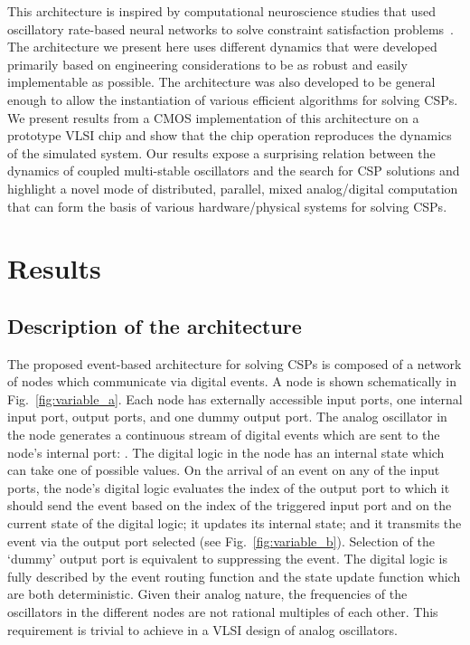 \documentclass[10pt]{article}
\begin{document}
This architecture is inspired by computational neuroscience studies that used oscillatory rate-based neural networks to solve constraint satisfaction problems~\cite{Mostafa_etal13b}. The architecture we present here uses different dynamics that were developed primarily based on engineering considerations to be as robust and easily implementable as possible. The architecture was also developed to be general enough to allow the instantiation of various efficient algorithms for solving CSPs. We present results from a CMOS implementation of this architecture on a prototype VLSI chip and show that the chip operation reproduces the dynamics of the simulated system.
Our results expose a surprising relation between the dynamics of coupled multi-stable oscillators and the search for CSP solutions and highlight a novel mode of distributed, parallel, mixed analog/digital computation that can form the basis of various hardware/physical systems for solving CSPs.








\section*{Results}
\subsection*{Description of the architecture}

The proposed event-based architecture for solving CSPs is composed of a network of nodes which communicate via digital events. A node is shown schematically in Fig.~\ref{fig:variable_a}. Each node has  externally accessible input ports, one internal input port,  output ports, and one dummy output port. The analog oscillator in the node generates a continuous stream of digital events which are sent to the node's internal port: . The digital logic in the node has an internal state  which can take one of  possible values. On the arrival of an event on any of the input ports, the node's digital logic evaluates the index of the output port to which it should send the event based on the index of the triggered input port and on the current state of the digital logic; it updates its internal state; and it transmits the event via the output port selected (see Fig.~\ref{fig:variable_b}). Selection of the `dummy' output port  is equivalent to suppressing the event. The digital logic is fully described by the event routing function  and the state update function  which are both deterministic. Given their analog nature, the frequencies of the oscillators in the different nodes are not rational multiples of each other. This requirement is trivial to achieve in a VLSI design of analog oscillators. 
\end{document}
